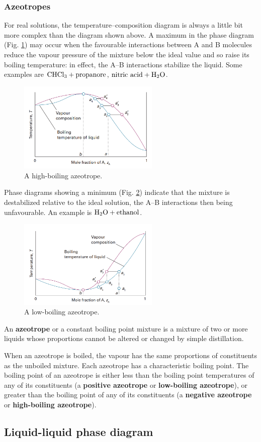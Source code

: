 \subsubsection{Azeotropes}
For real solutions, the temperature–composition diagram is always a little bit more complex than the diagram shown above. A maximum in the phase diagram (Fig. \ref{high-boiling azeotrope}) may occur when the favourable interactions between A and B molecules reduce the vapour pressure of the mixture below the ideal value and so raise its boiling temperature: in effect, the A–B interactions stabilize the liquid. Some examples are $\ce{CHCl3} + \text{propanore}$, $\text{nitric acid} + \ce{H2O}$.
\begin{figure}[H]
    \setlength{\abovecaptionskip}{0.5pt}
    \centering
    \includegraphics[width=0.6\textwidth]{"./fig/f5.png"}
    \caption{A high-boiling azeotrope.}
    \label{high-boiling azeotrope}
\end{figure}
Phase diagrams showing a minimum (Fig. \ref{low-boiling azeotrope}) indicate that the mixture is destabilized relative to the ideal solution, the A–B interactions then being unfavourable. An example is $\ce{H2O} + \text{ethanol}$.
\begin{figure}[H]
    \setlength{\abovecaptionskip}{0.5pt}
    \centering
    \includegraphics[width=0.6\textwidth]{"./fig/f6.png"}
    \caption{A low-boiling azeotrope.}
    \label{low-boiling azeotrope}
\end{figure}
\begin{definition}
    An \textbf{azeotrope} or a constant boiling point mixture is a mixture of two or more liquids whose proportions cannot be altered or changed by simple distillation. 
\end{definition}
When an azeotrope is boiled, the vapour has the same proportions of constituents as the unboiled mixture. Each azeotrope has a characteristic boiling point. The boiling point of an azeotrope is either less than the boiling point temperatures of any of its constituents (a \textbf{positive azeotrope} or \textbf{low-boiling azeotrope}), or greater than the boiling point of any of its constituents (a \textbf{negative azeotrope} or \textbf{high-boiling azeotrope}).
\subsection{Liquid-liquid phase diagram}





